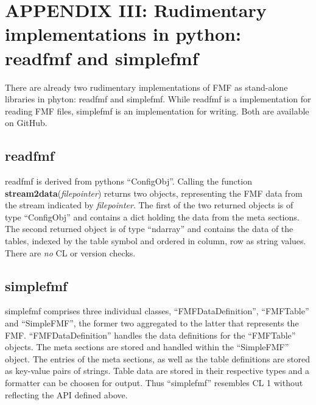 \documentclass[10pt,utf8, mainlanguage=english]{ufcd-info}
\newcommand{\fcal}[2]{{\textbf{#1}}(\textit{#2})}
\begin{document}
\section{APPENDIX III: Rudimentary implementations in python: readfmf and simplefmf}

There are already two rudimentary implementations of FMF as stand-alone libraries in phyton: readfmf and simplefmf. While read\-fmf is a implementation for reading FMF files, simplefmf is an implementation for writing. Both are available on GitHub.

\subsection{readfmf}

readfmf is derived from pythons \enquote{ConfigObj}. Calling the function \fcal{stream2data}{filepointer} returns two objects, representing the FMF data from the stream indicated by \textit{filepointer}. The first of the two returned objects is of type \enquote{ConfigObj} and contains a dict holding the data from the meta sections. The second returned object is of type \enquote{ndarray} and contains the data of the tables, indexed by the table symbol and ordered in column, row as string values. There are \emph{no} CL or version checks.

\subsection{simplefmf}

simplefmf comprises three individual classes, \enquote{FMFDataDefinition}, \enquote{FMFTable} and \enquote{SimpleFMF}, the former two aggregated to the latter that represents the FMF. \enquote{FMFDataDefinition} handles the data definitions for the \enquote{FMFTable} objects. The meta sections are stored and handled within the \enquote{SimpleFMF} object. The entries of the meta sections, as well as the table definitions are stored as key-value pairs of strings. Table data are stored in their respective types and a formatter can be choosen for output. Thus \enquote{simplefmf} resembles CL 1 without reflecting the API defined above.



\end{document}
